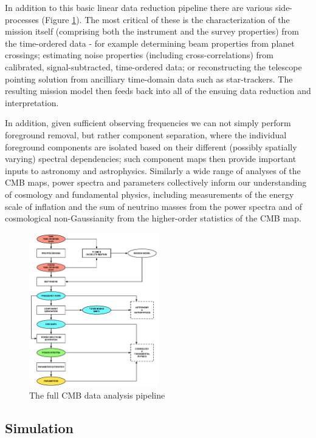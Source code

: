 In addition to this basic linear data reduction pipeline there are various side-processes (Figure \ref{fig_da}). The most critical of these is the characterization of the mission itself (comprising both the instrument and the survey properties) from the time-ordered data - for example determining beam properties from planet crossings; estimating noise properties (including cross-correlations) from calibrated, signal-subtracted, time-ordered data; or reconstructing the telescope pointing solution from ancilliary time-domain data such as star-trackers. The resulting mission model then feeds back into all of the ensuing data reduction and interpretation.

In addition, given sufficient observing frequencies we can not simply perform foreground removal, but rather component separation, where the individual foreground components are isolated based on their different (possibly spatially varying) spectral dependencies; such component maps then provide important inputs to astronomy and astrophysics. Similarly a wide range of analyses of the CMB maps, power spectra and parameters collectively inform our understanding of cosmology and fundamental physics, including measurements of the energy scale of inflation and the sum of neutrino masses from the power spectra and of cosmological non-Gaussianity from the higher-order statistics of the CMB map.

\begin{figure}[htbp]
\hspace*{3in}\includegraphics[width=0.5\textwidth]{Analysis/da}
\caption{The full CMB data analysis pipeline}
\label{fig_da}
\end{figure}

\newpage

\subsection{Simulation}


